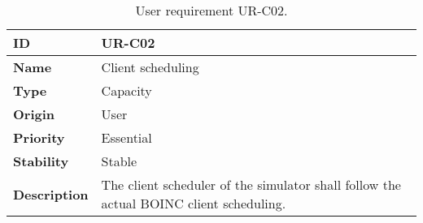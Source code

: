 \iffalse


\begin{center}
\begin{table*}[htbp]
\centering
\begin{tabular}{@{}p{2.5cm} p{9cm}@{}} 
\toprule
\textbf{ID} 				& UR-C02\\
\midrule
\textbf{Name} 			& Client \gls{scheduling} \\
\midrule
\textbf{Type} 			& Capacity \\
\midrule
\textbf{Origin} 			& User \\
\midrule
\textbf{Priority}		& Essential \\
\midrule
\textbf{Stability} 		& Stable \\
\midrule
\textbf{Description} 	& The client scheduler of the simulator shall follow the actual BOINC client \gls{scheduling}. \\
\bottomrule
\end{tabular}
\caption{User requirement UR-C02.}
\label{tab:urc02}
\end{table*}
\end{center}

